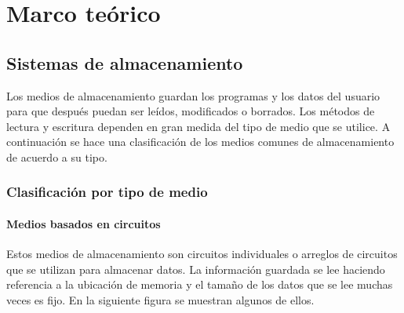 {
  \linespread{1}
  \cleardoublepage  
  \chapter{Marco te\'{o}rico}
  \label{chap:cap1}
}

  \section {Sistemas de almacenamiento}

Los medios de almacenamiento guardan los programas y los datos del usuario para que despu\'{e}s puedan ser le\'{i}dos, modificados o borrados. Los m\'{e}todos de lectura y escritura dependen en gran medida del tipo de medio que se utilice. A continuaci\'{o}n se hace una clasificaci\'{o}n de los medios comunes de almacenamiento de acuerdo a su tipo.

    \subsection {Clasificaci\'{o}n por tipo de medio}

      \subsubsection*{Medios basados en circuitos}

Estos medios de almacenamiento son circuitos individuales o arreglos de circuitos que se utilizan para almacenar datos. La informaci\'{o}n guardada se lee haciendo referencia a la ubicaci\'{o}n de memoria y el tama\~{n}o de los datos que se lee muchas veces es fijo. En la siguiente figura se muestran algunos de ellos.

